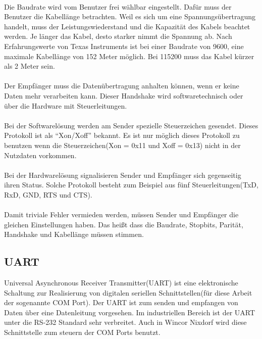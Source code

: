 \paragraph{}
Die Baudrate wird vom Benutzer frei wählbar eingestellt. Dafür muss der Benutzer die Kabellänge betrachten. Weil es sich um eine Spannungsübertragung handelt, muss der Leistungswiederstand und die Kapazität des Kabels beachtet werden. Je länger das Kabel, desto starker nimmt die Spannung ab. Nach Erfahrungswerte von Texas Instruments ist bei einer Baudrate von 9600, eine maximale Kabellänge von 152 Meter möglich. Bei 115200 muss das Kabel kürzer als 2 Meter sein.

\paragraph{}
Der Empfänger muss die Datenübertragung anhalten können, wenn er keine Daten mehr verarbeiten kann. Dieser Handshake wird softwaretechnisch oder über die Hardware mit Steuerleitungen.

\paragraph{}
Bei der Softwarelösung werden am Sender spezielle Steuerzeichen gesendet. Dieses Protokoll ist als "`Xon/Xoff"' bekannt. Es ist nur möglich dieses Protokoll zu benutzen wenn die Steuerzeichen(Xon = 0x11 und Xoff = 0x13) nicht in der Nutzdaten vorkommen.

\paragraph{}
Bei der Hardwarelösung signalisieren Sender und Empfänger sich gegenseitig ihren Status. Solche Protokoll besteht zum Beispiel aus fünf Steuerleitungen(TxD, RxD, GND, RTS und CTS).

\paragraph{}
Damit triviale Fehler vermieden werden, müssen Sender und Empfänger die gleichen Einstellungen haben. Das heißt dass die Baudrate, Stopbits, Parität, Handshake und Kabellänge müssen stimmen.


\subsection{UART}
Universal Asynchronous Receiver Transmitter(UART) ist eine elektronische Schaltung zur Realisierung von digitalen seriellen Schnittstellen(für diese Arbeit der sogenannte COM Port). Der UART ist zum senden und empfangen von Daten über eine Datenleitung vorgesehen. Im industriellen Bereich ist der UART unter die RS-232 Standard sehr verbreitet. Auch in Wincor Nixdorf wird diese Schnittstelle zum steuern der COM Ports benutzt.


